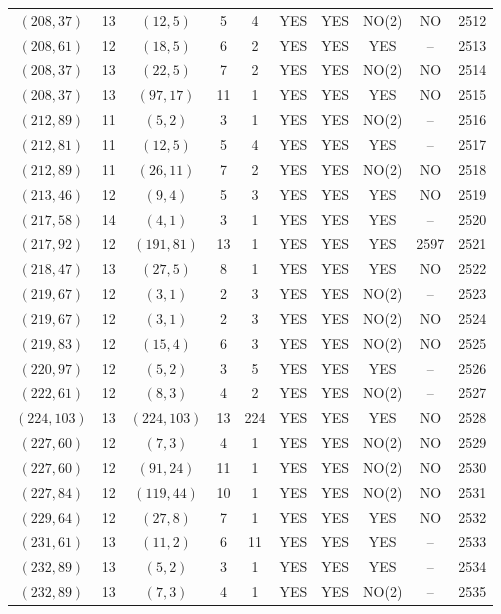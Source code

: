 \begin{longtable}{|c|c|c|c|c|c|c|c|c|c|}
$(208, 37)$ & 13 & $(12, 5)$ & 5 & 4 & YES & YES & NO(2) & NO & 2512\\
$(208, 61)$ & 12 & $(18, 5)$ & 6 & 2 & YES & YES & YES & -- & 2513\\
$(208, 37)$ & 13 & $(22, 5)$ & 7 & 2 & YES & YES & NO(2) & NO & 2514\\
$(208, 37)$ & 13 & $(97, 17)$ & 11 & 1 & YES & YES & YES & NO & 2515\\
$(212, 89)$ & 11 & $(5, 2)$ & 3 & 1 & YES & YES & NO(2) & -- & 2516\\
$(212, 81)$ & 11 & $(12, 5)$ & 5 & 4 & YES & YES & YES & -- & 2517\\
$(212, 89)$ & 11 & $(26, 11)$ & 7 & 2 & YES & YES & NO(2) & NO & 2518\\
$(213, 46)$ & 12 & $(9, 4)$ & 5 & 3 & YES & YES & YES & NO & 2519\\
$(217, 58)$ & 14 & $(4, 1)$ & 3 & 1 & YES & YES & YES & -- & 2520\\
$(217, 92)$ & 12 & $(191, 81)$ & 13 & 1 & YES & YES & YES & 2597 & 2521\\
$(218, 47)$ & 13 & $(27, 5)$ & 8 & 1 & YES & YES & YES & NO & 2522\\
$(219, 67)$ & 12 & $(3, 1)$ & 2 & 3 & YES & YES & NO(2) & -- & 2523\\
$(219, 67)$ & 12 & $(3, 1)$ & 2 & 3 & YES & YES & NO(2) & NO & 2524\\
$(219, 83)$ & 12 & $(15, 4)$ & 6 & 3 & YES & YES & NO(2) & NO & 2525\\
$(220, 97)$ & 12 & $(5, 2)$ & 3 & 5 & YES & YES & YES & -- & 2526\\
$(222, 61)$ & 12 & $(8, 3)$ & 4 & 2 & YES & YES & NO(2) & -- & 2527\\
$(224, 103)$ & 13 & $(224, 103)$ & 13 & 224 & YES & YES & YES & NO & 2528\\
$(227, 60)$ & 12 & $(7, 3)$ & 4 & 1 & YES & YES & NO(2) & NO & 2529\\
$(227, 60)$ & 12 & $(91, 24)$ & 11 & 1 & YES & YES & NO(2) & NO & 2530\\
$(227, 84)$ & 12 & $(119, 44)$ & 10 & 1 & YES & YES & NO(2) & NO & 2531\\
$(229, 64)$ & 12 & $(27, 8)$ & 7 & 1 & YES & YES & YES & NO & 2532\\
$(231, 61)$ & 13 & $(11, 2)$ & 6 & 11 & YES & YES & YES & -- & 2533\\
$(232, 89)$ & 13 & $(5, 2)$ & 3 & 1 & YES & YES & YES & -- & 2534\\
$(232, 89)$ & 13 & $(7, 3)$ & 4 & 1 & YES & YES & NO(2) & -- & 2535\\

\end{longtable}
